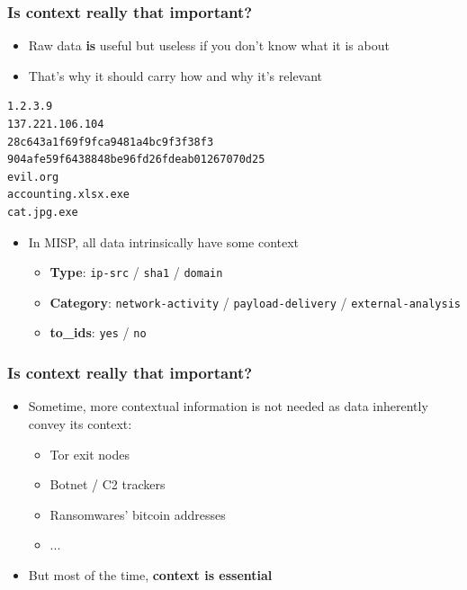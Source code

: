 \begin{frame}[fragile]
    \frametitle{Is context really that important?}
    
    \begin{itemize}
        \item Raw data \textbf{is} useful but useless if you don't know what it is about
        \item That's why it should carry how and why it's relevant
    \end{itemize}
    
    \begin{lstlisting}
1.2.3.9
137.221.106.104
28c643a1f69f9fca9481a4bc9f3f38f3
904afe59f6438848be96fd26fdeab01267070d25
evil.org
accounting.xlsx.exe
cat.jpg.exe
    \end{lstlisting}

    \begin{itemize}
        \item In MISP, all data intrinsically have some context
        \begin{itemize}
            \item \textbf{Type}: \texttt{ip-src} / \texttt{sha1} / \texttt{domain}
            \item \textbf{Category}: \texttt{network-activity} / \texttt{payload-delivery} / \texttt{external-analysis}
            \item \textbf{to\_ids}: \texttt{yes} / \texttt{no}
        \end{itemize}
    \end{itemize}

    
\end{frame}

\begin{frame}
    \frametitle{Is context really that important?}
    \begin{itemize}
        \item Sometime, more contextual information is not needed as data inherently convey its context:
        \begin{itemize}
            \item Tor exit nodes
            \item Botnet / C2 trackers
            \item Ransomwares' bitcoin addresses
            \item ...
        \end{itemize}
        \item But most of the time, \textbf{context is essential}
    \end{itemize}
\end{frame}

